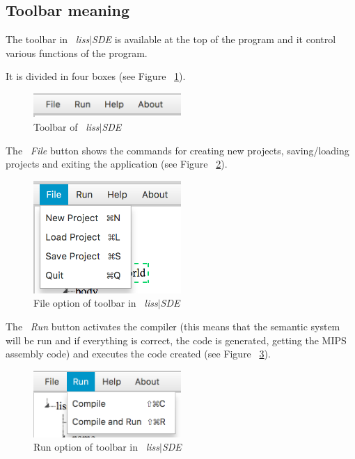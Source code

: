 \documentclass[
  oneside,
  11pt, a4paper,
  footinclude=true,
  headinclude=true,
  cleardoublepage=empty
]{scrbook}
\begin{document}
\subsection{Toolbar meaning}

The toolbar in ~\textit{liss$|$SDE} is available at the top of the program and it control various functions of the program.

It is divided in four boxes (see Figure ~\ref{fig:LISS-SDE_toolbar_1}).

\begin{figure}[h!]
  \centering
    \includegraphics[width=0.5\textwidth]{img/LISS-SDE_toolbar_menu/ToolBar_menu1.png}
    \caption{Toolbar of ~\textit{liss$|$SDE}}
    \label{fig:LISS-SDE_toolbar_1}
\end{figure}

The ~\textit{File} button shows the commands for creating new projects, saving/loading projects and exiting the application (see Figure ~\ref{fig:LISS-SDE_toolbar_2}).

\begin{figure}[h!]
  \centering
    \includegraphics[width=0.5\textwidth]{img/LISS-SDE_toolbar_menu/ToolBar_menu2.png}
    \caption{File option of toolbar in ~\textit{liss$|$SDE}}
    \label{fig:LISS-SDE_toolbar_2}
\end{figure}

The ~\textit{Run} button activates the compiler (this means that the semantic system will be run and if everything is correct, the code is generated, getting the MIPS assembly code) and executes the code created (see Figure ~\ref{fig:LISS-SDE_toolbar_3}).

\begin{figure}[h!]
  \centering
    \includegraphics[width=0.5\textwidth]{img/LISS-SDE_toolbar_menu/ToolBar_menu3.png}
    \caption{Run option of toolbar in ~\textit{liss$|$SDE}}
    \label{fig:LISS-SDE_toolbar_3}
\end{figure}
\end{document}
